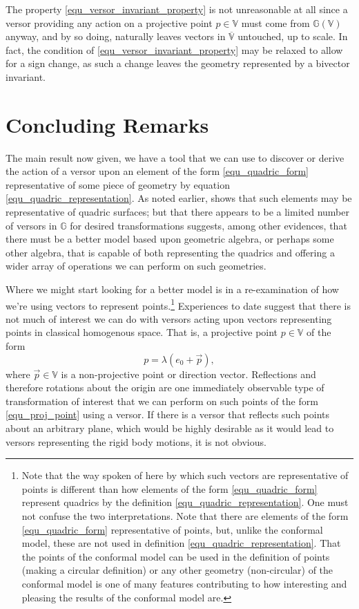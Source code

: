 \documentclass{birkjour}
\theoremstyle{definition}
\theoremstyle{remark}
\numberwithin{equation}{section}
\newcommand{\G}{\mathbb{G}}
\newcommand{\V}{\mathbb{V}}
\begin{document}
The property \eqref{equ_versor_invariant_property} is not unreasonable at all
since a versor providing any action on a projective point $p\in\V$ must come from $\G(\V)$ anyway,
and by so doing, naturally leaves vectors in $\overline{\V}$ untouched, up to scale.
In fact, the condition of \eqref{equ_versor_invariant_property} may be relaxed to allow
for a sign change, as such a change leaves the geometry represented by a bivector invariant.

\section{Concluding Remarks}

The main result now given, we have a tool that we can use to discover or derive the
action of a versor upon an element of the form \eqref{equ_quadric_form} representative of some piece of geometry
by equation \eqref{equ_quadric_representation}.  As noted earlier, \cite{Parkin12} shows that such elements may
be representative of quadric surfaces; but that there appears to be a limited number of
versors in $\G$ for desired transformations suggests, among other evidences, that there must
be a better model based upon geometric algebra, or perhaps some other algebra, that is capable of both representing the
quadrics and offering a wider array of operations we  can perform on such geometries.

Where we might start looking for a better model is in a re-examination of how we're using
vectors to represent points.\footnote{Note that the way spoken of here by which such vectors are
representative of points is different than how elements of the form \eqref{equ_quadric_form}
represent quadrics by the definition \eqref{equ_quadric_representation}.  One must not
confuse the two interpretations.  Note that there are elements of the form \eqref{equ_quadric_form}
representative of points, but, unlike the conformal model, these are not used in definition
\eqref{equ_quadric_representation}.  That the points of the conformal model can be used
in the definition of points (making a circular definition) or any other geometry (non-circular) of the conformal model is one of many
features contributing to how interesting and pleasing the results of the conformal model are.}
Experiences to date suggest that there is not much of interest we can do with versors acting
upon vectors representing points in classical homogenous space.  That is, a projective point $p\in\V$
of the form
\begin{equation}\label{equ_proj_point}
p = \lambda(e_0 + \vec{p}),
\end{equation}
where $\vec{p}\in\V$ is a non-projective point or direction vector.  Reflections and therefore rotations
about the origin are one immediately observable type of transformation of interest
that we can perform on such points of the form \eqref{equ_proj_point} using a versor.
If there is a versor that reflects such points about
an arbitrary plane, which would be highly desirable as it would lead to versors
representing the rigid body motions, it is not obvious.
\end{document}

